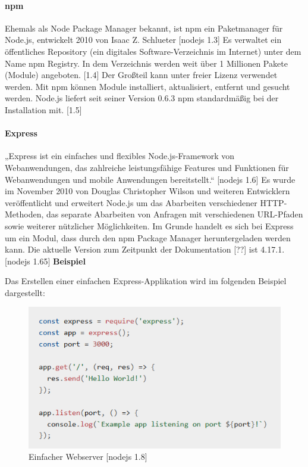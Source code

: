 \paragraph{npm}
Ehemals als Node Package Manager bekannt, ist npm ein Paketmanager für Node.js, entwickelt 2010 von Isaac Z. Schlueter [nodejs 1.3] Es verwaltet ein öffentliches Repository (ein digitales Software-Verzeichnis im Internet) unter dem Name npm Registry. In dem Verzeichnis werden weit über 1 Millionen Pakete (Module) angeboten. [1.4] Der Großteil kann unter freier Lizenz verwendet werden. Mit npm können Module installiert, aktualisiert, entfernt und gesucht werden. Node.js liefert seit seiner Version 0.6.3 npm standardmäßig bei der Installation mit. [1.5]

\paragraph{Express}
„Express ist ein einfaches und flexibles Node.js-Framework von Webanwendungen, das zahlreiche leistungsfähige Features und Funktionen für Webanwendungen und mobile Anwendungen bereitstellt.“ [nodejs 1.6] Es wurde im November 2010 von Douglas Christopher Wilson und weiteren Entwicklern veröffentlicht und erweitert Node.js um das Abarbeiten verschiedener HTTP-Methoden, das separate Abarbeiten von Anfragen mit verschiedenen URL-Pfaden sowie weiterer nützlicher Möglichkeiten. Im Grunde handelt es sich bei Express um ein Modul, dass durch den npm Package Manager heruntergeladen werden kann. Die aktuelle Version zum Zeitpunkt der Dokumentation [??] ist 4.17.1. [nodejs 1.65] \newline
\newline
\textbf{Beispiel}
 \newline

Das Erstellen einer einfachen Express-Applikation wird im folgenden Beispiel dargestellt:\newline

\begin{figure}[h]
\centering
\includegraphics{images/nodejs_express_einfacherWebserver.PNG}
\caption{Einfacher Webserver [nodejs 1.8]}
\end{figure}


